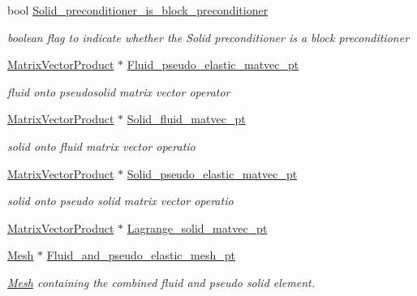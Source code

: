\begin{DoxyCompactItemize}
bool \hyperlink{classoomph_1_1PseudoElasticFSIPreconditioner_aa58001a8248ecac64087de254c0ae763}{Solid\+\_\+preconditioner\+\_\+is\+\_\+block\+\_\+preconditioner}
\begin{DoxyCompactList}\small\item\em boolean flag to indicate whether the Solid preconditioner is a block preconditioner \end{DoxyCompactList}\item 
\hyperlink{classoomph_1_1MatrixVectorProduct}{Matrix\+Vector\+Product} $\ast$ \hyperlink{classoomph_1_1PseudoElasticFSIPreconditioner_a77c8b262ee8535947e52f36462544eec}{Fluid\+\_\+pseudo\+\_\+elastic\+\_\+matvec\+\_\+pt}
\begin{DoxyCompactList}\small\item\em fluid onto pseudosolid matrix vector operator \end{DoxyCompactList}\item 
\hyperlink{classoomph_1_1MatrixVectorProduct}{Matrix\+Vector\+Product} $\ast$ \hyperlink{classoomph_1_1PseudoElasticFSIPreconditioner_a8699afc5b64ec0c3db5c3cea5fd60c18}{Solid\+\_\+fluid\+\_\+matvec\+\_\+pt}
\begin{DoxyCompactList}\small\item\em solid onto fluid matrix vector operatio \end{DoxyCompactList}\item 
\hyperlink{classoomph_1_1MatrixVectorProduct}{Matrix\+Vector\+Product} $\ast$ \hyperlink{classoomph_1_1PseudoElasticFSIPreconditioner_a05eb73f45602a85e5dfb0a9cd10a488e}{Solid\+\_\+pseudo\+\_\+elastic\+\_\+matvec\+\_\+pt}
\begin{DoxyCompactList}\small\item\em solid onto pseudo solid matrix vector operatio \end{DoxyCompactList}\item 
\hyperlink{classoomph_1_1MatrixVectorProduct}{Matrix\+Vector\+Product} $\ast$ \hyperlink{classoomph_1_1PseudoElasticFSIPreconditioner_a1129dcb6e7e335aca44acdb4231adc38}{Lagrange\+\_\+solid\+\_\+matvec\+\_\+pt}
\item 
\hyperlink{classoomph_1_1Mesh}{Mesh} $\ast$ \hyperlink{classoomph_1_1PseudoElasticFSIPreconditioner_a9d8025b022a2ca180210da2f7979dfe2}{Fluid\+\_\+and\+\_\+pseudo\+\_\+elastic\+\_\+mesh\+\_\+pt}
\begin{DoxyCompactList}\small\item\em \hyperlink{classoomph_1_1Mesh}{Mesh} containing the combined fluid and pseudo solid element. \end{DoxyCompactList}\item 

\end{DoxyCompactItemize}
